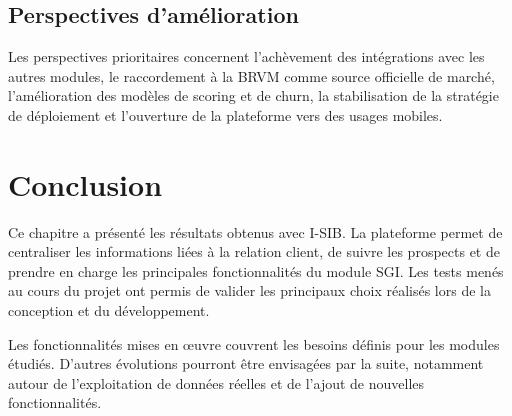\subsection{Perspectives d'amélioration}

Les perspectives prioritaires concernent l'achèvement des intégrations avec les
autres modules, le raccordement à la BRVM \cite{brvm_actions} comme source officielle de marché, l'amélioration des
modèles de scoring et de churn, la stabilisation de la stratégie de déploiement
et l'ouverture de la plateforme vers des usages mobiles.


\section*{Conclusion}
{}

Ce chapitre a présenté les résultats obtenus avec I-SIB. La plateforme permet de centraliser les informations liées à la relation client, de suivre les prospects et de prendre en charge les principales fonctionnalités du module SGI.
Les tests menés au cours du projet ont permis de valider les principaux choix réalisés lors de la conception et du développement.

Les fonctionnalités mises en œuvre couvrent les besoins définis pour les modules étudiés. D'autres évolutions pourront être envisagées par la suite, notamment autour de l'exploitation de données réelles et de l'ajout de nouvelles fonctionnalités.


